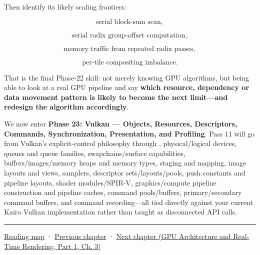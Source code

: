 Then identify its likely scaling frontiers:

\[
\text{serial block-sum scan},
\]

\[
\text{serial radix group-offset computation},
\]

\[
\text{memory traffic from repeated radix passes},
\]

\[
\text{per-tile compositing imbalance}.
\]

That is the final Phase-22 skill: not merely knowing GPU algorithms, but being able to look at a real GPU pipeline and say \textbf{which resource, dependency or data movement pattern is likely to become the next limit---and redesign the algorithm accordingly}.

We now enter \textbf{Phase 23: Vulkan --- Objects, Resources, Descriptors, Commands, Synchronization, Presentation, and Profiling}. Pass 11 will go from Vulkan's explicit-control philosophy through , physical/logical devices, queues and queue families, swapchains/surface capabilities, buffers/images/memory heaps and memory types, staging and mapping, image layouts and views, samplers, descriptor sets/layouts/pools, push constants and pipeline layouts, shader modules/SPIR-V, graphics/compute pipeline construction and pipeline caches, command pools/buffers, primary/secondary command buffers, and command recording---all tied directly against your current Kairo Vulkan implementation rather than taught as disconnected API calls.

\begin{center}\rule{0.5\linewidth}{0.5pt}\end{center}

\hyperref[volume-reading-map]{Reading map} · \hyperref[01-foundations-i-ch011-c-const-borrowing-and-cpugpu-buffering]{Previous chapter} · \href{../06-GPU-Architecture-and-Real-Time-Rendering-P01/main.pdf\#nameddest=01-foundations-i-ch013-open-vulkan-devices-and-describe-resources}{Next chapter (GPU Architecture and Real-Time Rendering, Part 1, Ch. 3)}
